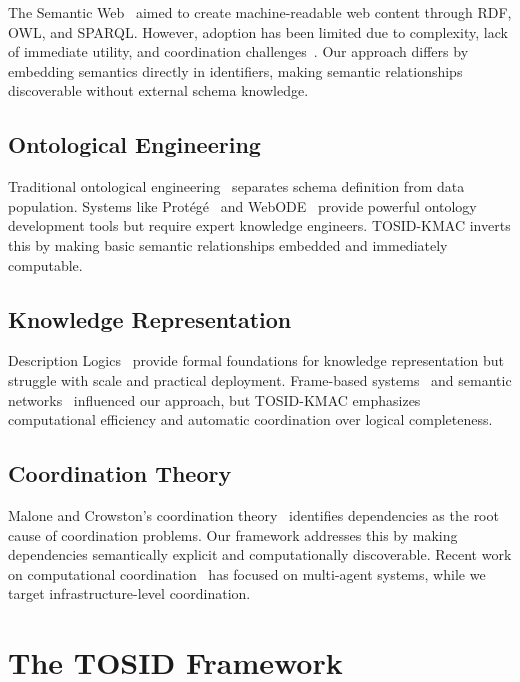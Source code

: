 \documentclass[conference]{IEEEtran}
\begin{document}
The Semantic Web~\cite{berners2001semantic} aimed to create machine-readable web content through RDF, OWL, and SPARQL. However, adoption has been limited due to complexity, lack of immediate utility, and coordination challenges~\cite{shadbolt2006semantic}. Our approach differs by embedding semantics directly in identifiers, making semantic relationships discoverable without external schema knowledge.

\subsection{Ontological Engineering}

Traditional ontological engineering~\cite{gomez2004ontological} separates schema definition from data population. Systems like Protégé~\cite{gennari2003evolution} and WebODE~\cite{arpírez2003webode} provide powerful ontology development tools but require expert knowledge engineers. TOSID-KMAC inverts this by making basic semantic relationships embedded and immediately computable.

\subsection{Knowledge Representation}

Description Logics~\cite{baader2003description} provide formal foundations for knowledge representation but struggle with scale and practical deployment. Frame-based systems~\cite{minsky1975framework} and semantic networks~\cite{quillian1968semantic} influenced our approach, but TOSID-KMAC emphasizes computational efficiency and automatic coordination over logical completeness.

\subsection{Coordination Theory}

Malone and Crowston's coordination theory~\cite{malone1994interdisciplinary} identifies dependencies as the root cause of coordination problems. Our framework addresses this by making dependencies semantically explicit and computationally discoverable. Recent work on computational coordination~\cite{jennings2001coordination} has focused on multi-agent systems, while we target infrastructure-level coordination.

\section{The TOSID Framework}
\end{document}
